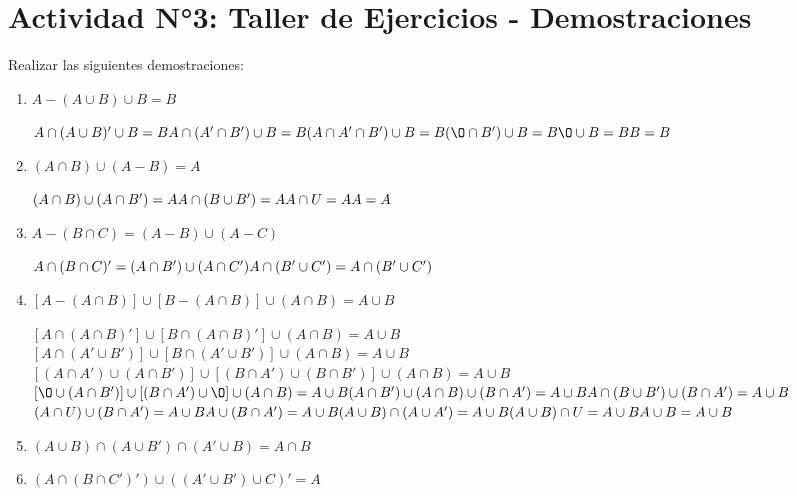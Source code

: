 \documentclass[12pt]{article}
\begin{document}
    
  
    \section*{\centering Actividad N°3: Taller de Ejercicios - Demostraciones}
        Realizar las siguientes demostraciones:

        \begin{enumerate}
            \item $A - (A \cup B) \cup B = B $
                \par$A \cap (A \cup B)' \cup B = B\\A \cap (A' \cap B') \cup B = B\\(A \cap A' \cap B') \cup B = B\\(\O \cap B') \cup B = B\\\O \cup B = B\\B = B$    

            \item $(A \cap B) \cup (A - B) = A$
                \par$(A \cap B) \cup (A \cap B') = A\\ A \cap (B \cup B') = A\\A \cap U = A\\A = A$

            \item $A - (B \cap C) = (A - B) \cup (A - C)$
                \par$A \cap (B \cap C)' = (A \cap B') \cup (A \cap C')\\A \cap (B' \cup C') = A \cap (B' \cup C')$

            \item $[A - (A \cap B)] \cup [B - (A \cap B)] \cup (A \cap B) = A \cup B$
                \par$[A \cap (A \cap B)'] \cup [B \cap (A \cap B)'] \cup (A \cap B) = A\cup B$\\$[A \cap (A' \cup B')] \cup [B \cap (A' \cup B')] \cup (A \cap B) = A \cup B$\\$[(A \cap A') \cup (A \cap B')] \cup [(B \cap A') \cup (B \cap B')] \cup (A \cap B) = A \cup B$\\$[\O \cup (A \cap B')] \cup [(B \cap A') \cup \O] \cup (A \cap B) = A \cup B\\(A \cap B') \cup (A \cap B) \cup (B \cap A') = A \cup B\\A \cap (B \cup B') \cup (B \cap A') = A \cup B$
                \\$(A \cap U) \cup (B \cap A') = A \cup B\\A \cup (B \cap A') = A \cup B\\(A \cup B) \cap (A \cup A') = A \cup B\\(A \cup B) \cap U = A \cup B\\A \cup B = A \cup B$

            \item $(A \cup B) \cap (A \cup B') \cap (A' \cup B) = A \cap B$
            \item $(A \cap (B \cap C')') \cup ((A' \cup B') \cup C)' = A$
        \end{enumerate}
\end{document}
